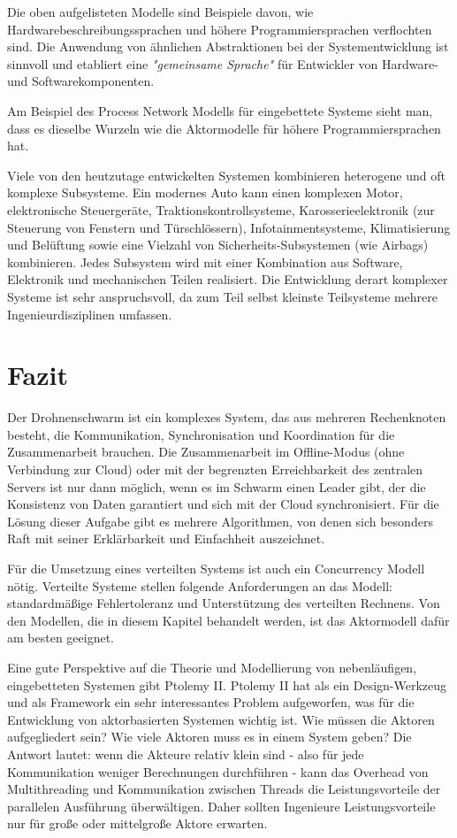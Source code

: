 Die oben aufgelisteten Modelle sind Beispiele davon, wie Hardwarebeschreibungssprachen und höhere Programmiersprachen verflochten sind. Die Anwendung von ähnlichen Abstraktionen bei der Systementwicklung ist sinnvoll und etabliert eine \textit{"gemeinsame Sprache"} für Entwickler von Hardware- und Softwarekomponenten.

Am Beispiel des Process Network Modells für eingebettete Systeme sieht man, dass es dieselbe Wurzeln wie die Aktormodelle für höhere Programmiersprachen hat.

Viele von den heutzutage entwickelten Systemen kombinieren heterogene und oft komplexe Subsysteme. Ein modernes Auto kann einen komplexen Motor, elektronische Steuergeräte, Traktionskontrollsysteme, Karosserieelektronik (zur Steuerung von Fenstern und Türschlössern), Infotainmentsysteme, Klimatisierung und Belüftung sowie eine Vielzahl von Sicherheits-Subsystemen (wie Airbags) kombinieren. Jedes Subsystem wird mit einer Kombination aus Software, Elektronik und mechanischen Teilen realisiert. Die Entwicklung derart komplexer Systeme ist sehr anspruchsvoll, da zum Teil selbst kleinste Teilsysteme mehrere Ingenieurdisziplinen umfassen.

\section{Fazit}

Der Drohnenschwarm ist ein komplexes System, das aus mehreren Rechenknoten besteht, die Kommunikation, Synchronisation und Koordination für die Zusammenarbeit brauchen. Die Zusammenarbeit im Offline-Modus (ohne Verbindung zur Cloud) oder mit der begrenzten Erreichbarkeit des zentralen Servers ist nur dann möglich, wenn es im Schwarm einen Leader gibt, der die Konsistenz von Daten garantiert und sich mit der Cloud synchronisiert. Für die Lösung dieser Aufgabe gibt es mehrere Algorithmen, von denen sich besonders Raft mit seiner Erklärbarkeit und Einfachheit auszeichnet.

Für die Umsetzung eines verteilten Systems ist auch ein Concurrency Modell nötig. Verteilte Systeme stellen folgende Anforderungen an das Modell: standardmäßige Fehlertoleranz und Unterstützung des verteilten Rechnens. Von den Modellen, die in diesem Kapitel behandelt werden, ist das Aktormodell dafür am besten geeignet.

Eine gute Perspektive auf die Theorie und Modellierung von nebenläufigen, eingebetteten Systemen gibt Ptolemy II. Ptolemy II hat als ein Design-Werkzeug und als Framework ein sehr interessantes Problem aufgeworfen, was für die Entwicklung von aktorbasierten Systemen wichtig ist. Wie müssen die Aktoren aufgegliedert sein? Wie viele Aktoren muss es in einem System geben? Die Antwort lautet: wenn die Akteure relativ klein sind - also für jede Kommunikation weniger Berechnungen durchführen - kann das Overhead von Multithreading und Kommunikation zwischen Threads die Leistungsvorteile der parallelen Ausführung überwältigen. Daher sollten Ingenieure Leistungsvorteile nur für große oder mittelgroße Aktore erwarten.